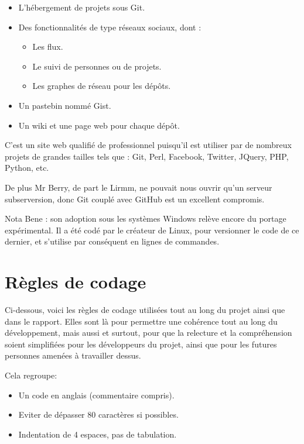     \begin{itemize}
    \item L'hébergement de projets sous Git.
    \item Des fonctionnalités de type réseaux sociaux, dont :
        \begin{itemize}
        \item Les flux.
        \item Le suivi de personnes ou de projets.
        \item Les graphes de réseau pour les dépôts.
        \end{itemize}
    \item Un pastebin nommé Gist.
    \item Un wiki et une page web pour chaque dépôt.
    \end{itemize}

    C'est un site web qualifié de professionnel puisqu'il est utiliser par de 
    nombreux projets de grandes tailles tels que : Git, Perl, Facebook, Twitter,
    JQuery, PHP, Python, etc.

        De plus Mr Berry, de part le Lirmm, ne pouvait nous ouvrir qu'un serveur
    subserversion, donc Git couplé avec GitHub est un excellent compromis.

    Nota Bene : son adoption sous les systèmes Windows relève encore du portage
    expérimental. Il a été codé par le créateur de Linux, pour versionner le code
    de ce dernier, et s'utilise par conséquent en lignes de commandes.






\newpage
    \section{Règles de codage}
        Ci-dessous, voici les règles de codage utilisées tout au long du projet
    ainsi que dans le rapport. Elles sont là pour permettre une cohérence tout au
    long du développement, mais aussi et surtout, pour que la relecture et la 
    compréhension soient simplifiées pour les développeurs du projet, ainsi que pour les
    futures personnes amenées à travailler dessus.

    Cela regroupe:
    \begin{itemize}
    \item Un code en anglais (commentaire compris).
    \item Eviter de dépasser 80 caractères si possibles.
    \item Indentation de 4 espaces, pas de tabulation.
    \end{itemize}

